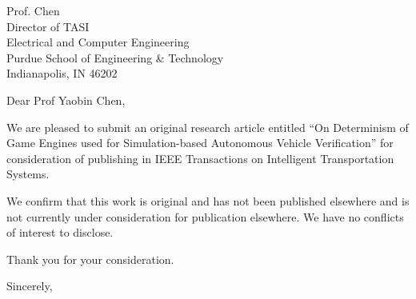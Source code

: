 \documentclass[11pt, a4paper]{letter} %
\begin{document}

\begin{letter}{
	Prof. Chen\\
	Director of TASI\\
	Electrical and Computer Engineering\\
	Purdue School of Engineering \& Technology\\
	Indianapolis, IN 46202
}


\opening{Dear Prof Yaobin Chen,}

We are pleased to submit an original research article entitled “On Determinism of Game Engines used for Simulation-based Autonomous Vehicle Verification” for consideration of publishing in IEEE Transactions on Intelligent Transportation Systems. 

We confirm that this work is original and has not been published elsewhere and is not currently under consideration for publication elsewhere. We have no conflicts of interest to disclose. 

Thank you for your consideration. 

\closing{Sincerely,}






\end{letter}
\end{document}
